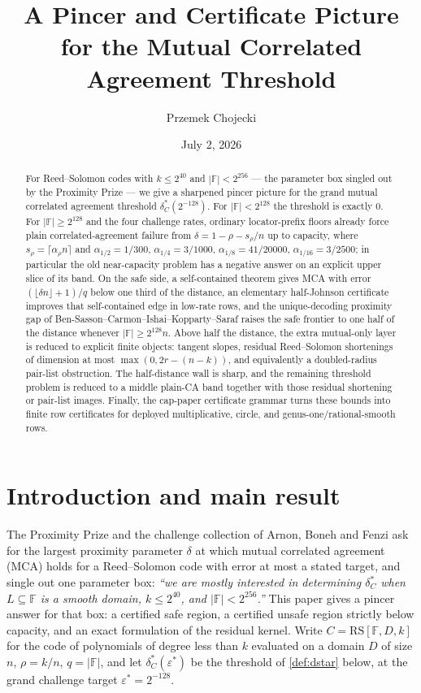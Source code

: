 \documentclass[11pt]{amsart}
\title{A Pincer and Certificate Picture for the Mutual Correlated Agreement Threshold}
\author{Przemek Chojecki}
\date{July 2, 2026}
\theoremstyle{definition}
\theoremstyle{remark}
\newcommand{\F}{\mathbb{F}}
\newcommand{\RS}{\mathrm{RS}}
\begin{document}
\begin{abstract}
For Reed--Solomon codes with $k\le2^{40}$ and $|\F|<2^{256}$ --- the parameter box singled out by the Proximity Prize --- we give a sharpened pincer picture for the grand mutual correlated agreement threshold $\delta^*_C(2^{-128})$. For $|\F|<2^{128}$ the threshold is exactly $0$. For $|\F|\ge2^{128}$ and the four challenge rates, ordinary locator-prefix floors already force plain correlated-agreement failure from $\delta=1-\rho-s_\rho/n$ up to capacity, where $s_\rho=\lceil\alpha_\rho n\rceil$ and $\alpha_{1/2}=1/300$, $\alpha_{1/4}=3/1000$, $\alpha_{1/8}=41/20000$, $\alpha_{1/16}=3/2500$; in particular the old near-capacity problem has a negative answer on an explicit upper slice of its band. On the safe side, a self-contained theorem gives MCA with error $(\lfloor\delta n\rfloor+1)/q$ below one third of the distance, an elementary half-Johnson certificate improves that self-contained edge in low-rate rows, and the unique-decoding proximity gap of Ben-Sasson--Carmon--Ishai--Kopparty--Saraf raises the safe frontier to one half of the distance whenever $|\F|\ge2^{128}n$. Above half the distance, the extra mutual-only layer is reduced to explicit finite objects: tangent slopes, residual Reed--Solomon shortenings of dimension at most $\max(0,2r-(n-k))$, and equivalently a doubled-radius pair-list obstruction. The half-distance wall is sharp, and the remaining threshold problem is reduced to a middle plain-CA band together with those residual shortening or pair-list images.  Finally, the cap-paper certificate grammar turns these bounds into finite row certificates for deployed multiplicative, circle, and genus-one/rational-smooth rows.
\end{abstract}

\maketitle

\section{Introduction and main result}\label{sec:intro}

The Proximity Prize \cite{ProximityPrize} and the challenge collection of Arnon, Boneh and Fenzi \cite{ABF26} ask for the largest proximity parameter $\delta$ at which mutual correlated agreement (MCA) holds for a Reed--Solomon code with error at most a stated target, and single out one parameter box: \emph{``we are mostly interested in determining $\delta^*_C$ when $L\subseteq\F$ is a smooth domain, $k\le2^{40}$, and $|\F|<2^{256}$.''} This paper gives a pincer answer for that box: a certified safe region, a certified unsafe region strictly below capacity, and an exact formulation of the residual kernel. Write $C=\RS[\F,D,k]$ for the code of polynomials of degree less than $k$ evaluated on a domain $D$ of size $n$, $\rho=k/n$, $q=|\F|$, and let $\delta^*_C(\varepsilon^*)$ be the threshold of \cref{def:dstar} below, at the grand challenge target $\varepsilon^*=2^{-128}$.
\end{document}
